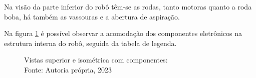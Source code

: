 Na visão da parte inferior do robô têm-se as rodas, tanto motoras quanto a roda boba, há também as vassouras e a abertura de aspiração.

\newpage
\pagebreak
Na figura \ref{fig:subfig} é possível observar a acomodação dos componentes eletrônicos na estrutura interna do robô, seguida da tabela de legenda.
\\
\begin{figure}[h!]
\centering
{}
\hfill
{}
\caption{Vistas superior e isométrica com componentes:\\Fonte: Autoria própria, 2023}
\label{fig:subfig}
\end{figure}

